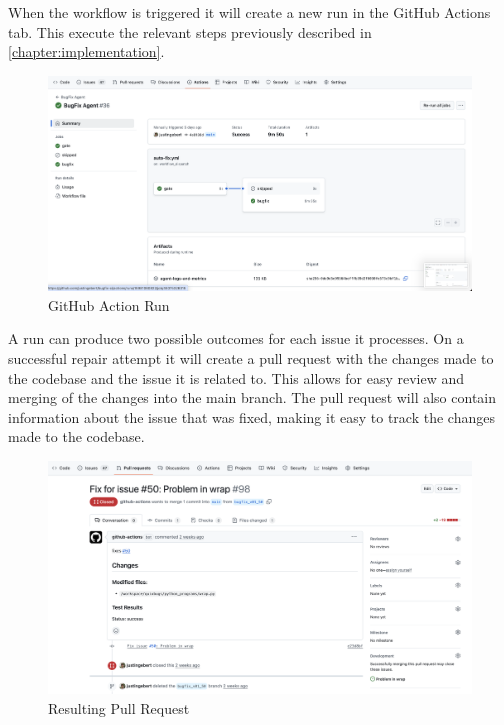 When the workflow is triggered it will create a new run in the GitHub Actions tab. This execute the relevant steps previously described in \ref{chapter:implementation}.

\begin{figure}[H]
    \centering
    \includegraphics[width=1\textwidth]{images/workflow/Action.png}
    \caption{GitHub Action Run}
    \label{fig:apr-action}
\end{figure}

A run can produce two possible outcomes for each issue it processes. On a successful repair attempt it will create a pull request with the changes made to the codebase and the issue it is related to. This allows for easy review and merging of the changes into the main branch. The pull request will also contain information about the issue that was fixed, making it easy to track the changes made to the codebase.
\begin{figure}[H]
    \centering
    \includegraphics[width=1\textwidth]{images/workflow/PR.png}
    \caption{Resulting Pull Request}
    \label{fig:pr}
\end{figure}


